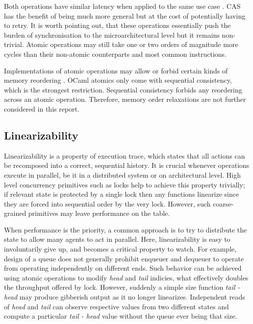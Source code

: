 \documentclass[12pt,a4paper,twoside]{report}
\begin{document}
Both operations have similar latency when applied to the same use case \cite{fad-cas-speed}. CAS has the benefit of being much more general but at the cost of potentially having to retry. It is worth pointing out, that these operations essentially push the burden of synchronisation to the microarchitectural level but it remains non-trivial. Atomic operations may still take one or two orders of magnitude more cycles than their non-atomic counterparts and most common instructions. 

Implementations of atomic operations may allow or forbid certain kinds of memory reordering \cite{memoryor11:online}. OCaml atomics only come with sequential consistency, which is the strongest restriction. Sequential consistency forbids any reordering across an atomic operation. Therefore, memory order relaxations are not further considered in this report.

\subsection{Linearizability}
\label{section:linearizability}
Linearizability is a property of execution trace, which states that all actions can be recomposed into a correct, sequential history. It is crucial whenever operations execute in parallel, be it in a distributed system or on architectural level. High level concurrency primitives such as locks help to achieve this property trivially; if relevant state is protected by a single lock then any functions linearize since they are forced into sequential order by the very lock. However, such coarse-grained primitives may leave performance on the table. 

When performance is the priority, a common approach is to try to distribute the state to allow many agents to act in parallel. Here, linearizability is easy to involuntarily give up, and becomes a critical property to watch. For example, design of a queue does not generally prohibit enqueuer and dequeuer to operate from operating independently on different ends. Such behavior can be achieved using atomic operations to modify \textit{head} and \textit{tail} indicies, what effectively doubles the throughput offered by lock. However, suddenly a simple size function \textit{tail - head} may produce gibberish output as it no longer linearizes. Independent reads of \textit{head} and \textit{tail} can observe respective values from two different states and compute a particular \textit{tail - head} value without the queue ever being that size.
\end{document}
